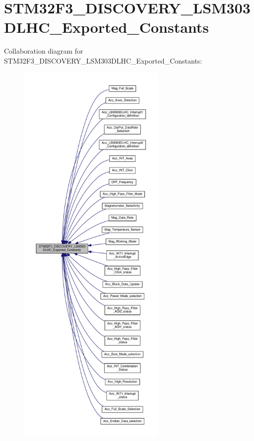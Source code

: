\hypertarget{group__STM32F3__DISCOVERY__LSM303DLHC__Exported__Constants}{\section{S\+T\+M32\+F3\+\_\+\+D\+I\+S\+C\+O\+V\+E\+R\+Y\+\_\+\+L\+S\+M303\+D\+L\+H\+C\+\_\+\+Exported\+\_\+\+Constants}
\label{group__STM32F3__DISCOVERY__LSM303DLHC__Exported__Constants}
}
Collaboration diagram for S\+T\+M32\+F3\+\_\+\+D\+I\+S\+C\+O\+V\+E\+R\+Y\+\_\+\+L\+S\+M303\+D\+L\+H\+C\+\_\+\+Exported\+\_\+\+Constants\+:\nopagebreak
\begin{figure}[H]
\begin{center}
\leavevmode
\includegraphics[height=550pt]{group__STM32F3__DISCOVERY__LSM303DLHC__Exported__Constants}
\end{center}
\end{figure}
